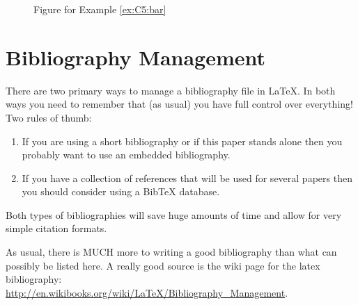 \begin{figure}
    \begin{center}
    \end{center}
    \caption{Figure for Example \ref{ex:C5:bar}}
    \label{fig:C5:bar}
\end{figure}


\section{Bibliography Management}
There are two primary ways to manage a bibliography file in \LaTeX.  In both ways you need
to remember that (as usual) you have full control over everything!  Two rules of thumb:
\begin{enumerate}
    \item If you are using a short bibliography or if this paper stands alone then you
        probably want to use an embedded bibliography.
    \item If you have a collection of references that will be used for several papers then
        you should consider using a BibTeX database.
\end{enumerate}
Both types of bibliographies will save huge amounts of time and allow for very simple
citation formats. 

As usual, there is MUCH more to writing a good bibliography than what can possibly be
listed here.  A really good source is the wiki page for the latex bibliography: \\
\href{http://en.wikibooks.org/wiki/LaTeX/Bibliography_Management}{http://en.wikibooks.org/wiki/LaTeX/Bibliography\_Management}.

